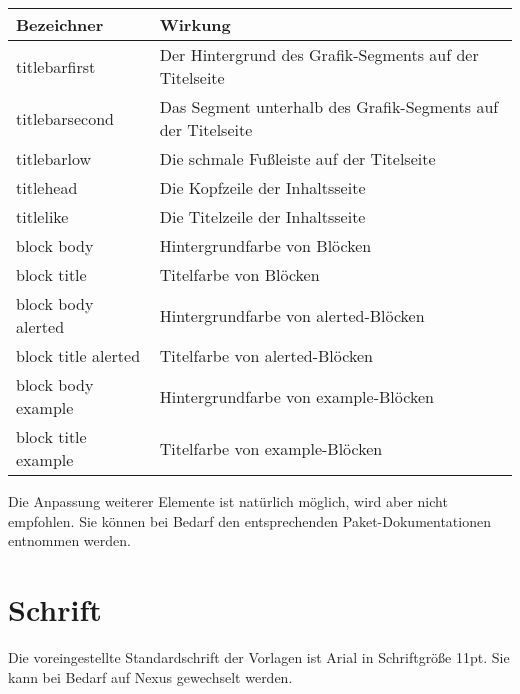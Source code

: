 \begin{tabularx}{\textwidth}{lX}
  Bezeichner & Wirkung\\
  \midrule
  \ttfamily titlebarfirst &
    Der Hintergrund des Grafik-Segments auf der Titelseite\\
  \ttfamily titlebarsecond &
    Das Segment unterhalb des Grafik-Segments auf der Titelseite\\
  \ttfamily titlebarlow &
    Die schmale Fußleiste auf der Titelseite\\
  \ttfamily titlehead &
    Die Kopfzeile der Inhaltsseite\\
  \ttfamily titlelike &
    Die Titelzeile der Inhaltsseite\\
  \ttfamily block body &
    Hintergrundfarbe von Blöcken\\
  \ttfamily block title &
    Titelfarbe von Blöcken\\
  \ttfamily block body alerted &
    Hintergrundfarbe von alerted-Blöcken\\
  \ttfamily block title alerted &
    Titelfarbe von alerted-Blöcken\\
  \ttfamily block body example &
    Hintergrundfarbe von example-Blöcken\\
  \ttfamily block title example &
    Titelfarbe von example-Blöcken\
\end{tabularx}

Die Anpassung weiterer Elemente ist natürlich möglich,
wird aber nicht empfohlen.
Sie können bei Bedarf den entsprechenden Paket-Dokumentationen entnommen werden.


% 
% 

\section{Schrift}

Die voreingestellte Standardschrift der Vorlagen ist Arial in Schriftgröße 11pt.
Sie kann bei Bedarf auf Nexus gewechselt werden.

\begin{Declaration}
  \\
\end{Declaration}

